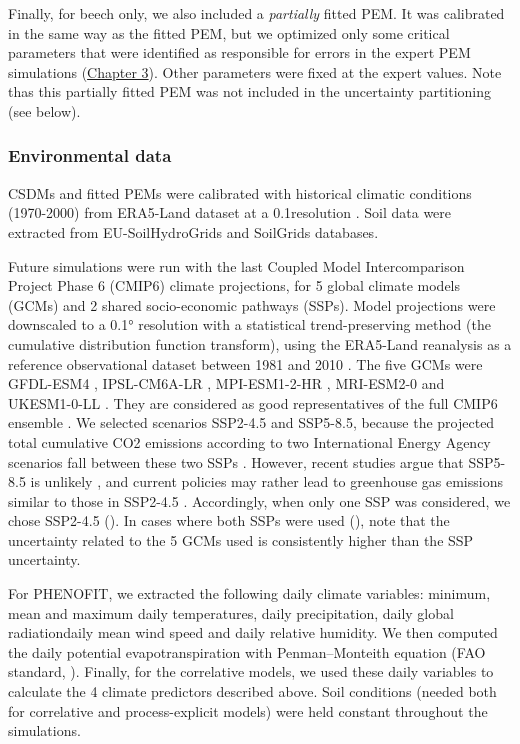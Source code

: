 \documentclass[letterpaper,8pt]{extarticle}  %
\begin{document}
\begin{doublespacing}
\begin{linenumbers}
Finally, for beech only, we also included a \emph{partially} fitted PEM. It was calibrated in the same way as the fitted PEM, but we optimized only some critical parameters that were identified as responsible for errors in the expert PEM simulations (\hyperref[chapter3]{Chapter 3}). Other parameters were fixed at the expert values. Note thas this partially fitted PEM was not included in the uncertainty partitioning (see below).

\subsubsection{Environmental data}

CSDMs and fitted PEMs were calibrated with historical climatic conditions (1970-2000) from ERA5-Land dataset at a 0.1\degree resolution \citep{MunozSabater2021}. Soil data were extracted from EU-SoilHydroGrids \citep{Toth2017} and SoilGrids \citep{Hengl2017} databases.

Future simulations were run with the last Coupled Model Intercomparison Project Phase 6 (CMIP6) climate  projections, for 5 global climate models (GCMs) and 2 shared socio-economic pathways (SSPs). 
Model projections were downscaled to a 0.1° resolution with a statistical trend-preserving method (the cumulative distribution function transform), using the ERA5-Land reanalysis as a reference observational dataset between 1981 and 2010 \citep{Noel2022}. The five GCMs were GFDL-ESM4 \citep{Dunne2020}, IPSL-CM6A-LR \citep{Lurton2020}, MPI-ESM1-2-HR \citep{Mueller2018}, MRI-ESM2-0 \citep{Yukimoto2019} and UKESM1-0-LL \citep{Sellar2020}. They are considered as good representatives of the full CMIP6 ensemble \citep{Noel2022}. We selected scenarios SSP2-4.5 and SSP5-8.5, because the projected total cumulative CO2 emissions according to two International Energy Agency scenarios fall between these two SSPs \citep{Schwalm2020}. However, recent studies argue that SSP5-8.5 is unlikely \citep{Hausfather2020}, and current policies may rather lead to greenhouse gas emissions similar to those in SSP2-4.5 \citep{Gillett2024}. Accordingly, when only one SSP was considered, we chose SSP2-4.5 (). In cases where both SSPs were used (), note that the uncertainty related to the 5 GCMs used is consistently higher than the SSP uncertainty.

For PHENOFIT, we extracted the following daily climate variables: minimum, mean and maximum daily temperatures, daily precipitation, daily global radiationdaily mean wind speed and daily relative humidity. We then computed the daily potential evapotranspiration with Penman–Monteith equation (FAO standard, \citealp{Allen1998}). Finally, for the correlative models, we used these daily variables to calculate the 4 climate predictors described above.  Soil conditions (needed both for correlative and process-explicit models) were held constant throughout the simulations.


\end{linenumbers}
\end{doublespacing}
\end{document}
